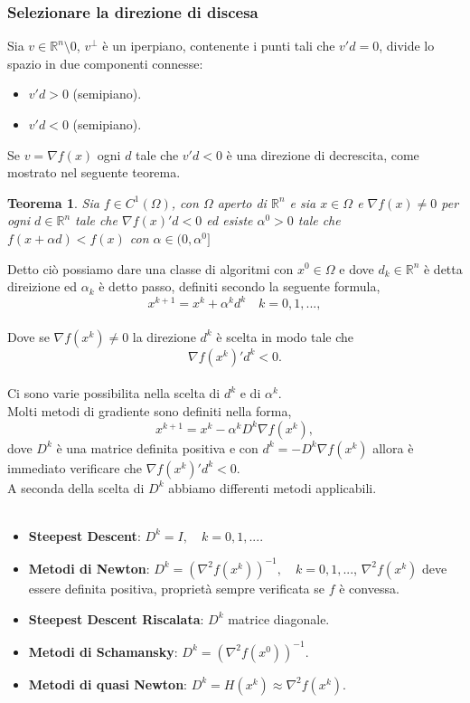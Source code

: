 \documentclass[a4paper, 12pt]{article}
\newtheorem{theorem}{Teorema}
\begin{document}
\subsubsection{Selezionare la direzione di discesa}
Sia $v \in \mathbb{R}^n \setminus 0$, $v^\perp$ è un iperpiano, contenente i punti tali che $v'd = 0$, divide lo spazio in due componenti connesse:
\begin{itemize}
  \item $v'd > 0$ (semipiano).
  \item $v'd < 0$ (semipiano).
\end{itemize}
Se $v = \nabla f(x)$ ogni $d$ tale che $v'd < 0$ è una direzione di decrescita, come mostrato nel seguente teorema.
\begin{theorem}
Sia $f \in C^1(\Omega)$, con $\Omega$ aperto di $\mathbb{R}^n$ e sia $x \in \Omega$ e $\nabla f(x) \neq 0$ per ogni $d \in \mathbb{R}^n$ tale che $\nabla f(x)'d < 0$ ed esiste $\alpha^0 > 0$ tale che $f(x + \alpha d) < f(x)$ con $\alpha \in (0, \alpha^0]$
\end{theorem}
Detto ciò possiamo dare una classe di algoritmi con $x^0 \in \Omega$ e dove $d_k \in \mathbb{R}^n$ è detta direizione ed $\alpha_k$ è detto passo, definiti secondo la seguente formula,\\
\[x^{k+1} = x^k + \alpha^k d^k \quad k=0, 1, ... ,\]\\
Dove se $\nabla f(x^k) \neq 0$ la direzione $d^k$ è scelta in modo tale che\\
\[\nabla f(x^k)'d^k < 0.\]\\
Ci sono varie possibilita nella scelta di $d^k$ e di $\alpha^k$.\\
Molti metodi di gradiente sono definiti nella forma,
\[x^{k+1} = x^k - \alpha^k D^k \nabla f(x^k),\]
dove $D^k$ è una matrice definita positiva e con $d^k = -D^k\nabla f(x^k)$ allora è immediato verificare che $\nabla f(x^k)'d^k < 0$.\\
A seconda della scelta di $D^k$ abbiamo differenti metodi applicabili.\\\\
\begin{itemize}
    \item \textbf{Steepest Descent}: $D^k = I, \quad k = 0, 1, ...$.
    \item \textbf{Metodi di Newton}: $D^k = (\nabla^2 f(x^k))^{-1}, \quad k = 0, 1, ...$, $\nabla^2 f(x^k)$ deve essere definita positiva, proprietà sempre verificata se $f$ è convessa.
    \item \textbf{Steepest Descent Riscalata}: $D^k$ matrice diagonale.
    \item \textbf{Metodi di Schamansky}: $D^k = (\nabla^2 f(x^0))^{-1}$.
    \item \textbf{Metodi di quasi Newton}: $D^k = H(x^k) \approx \nabla^2 f(x^k)$.
\end{itemize}
\end{document}
